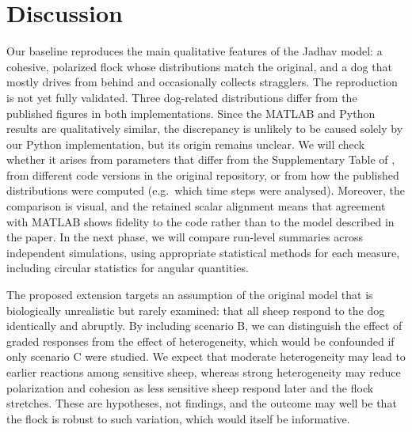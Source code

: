 \documentclass[9pt,twoside]{pnas-new}
\begin{document}


\section{Discussion}

Our baseline reproduces the main qualitative features of the Jadhav model: a cohesive, polarized flock whose distributions match the original, and a dog that mostly drives from behind and occasionally collects stragglers. The reproduction is not yet fully validated. Three dog-related distributions differ from the published figures in both implementations. Since the MATLAB and Python results are qualitatively similar, the discrepancy is unlikely to be caused solely by our Python implementation, but its origin remains unclear. We will check whether it arises from parameters that differ from the Supplementary Table of \cite{jadhav2024}, from different code versions in the original repository, or from how the published distributions were computed (e.g.\ which time steps were analysed). Moreover, the comparison is visual, and the retained scalar alignment means that agreement with MATLAB shows fidelity to the code rather than to the model described in the paper. In the next phase, we will compare run-level summaries across independent simulations, using appropriate statistical methods for each measure, including circular statistics for angular quantities.

The proposed extension targets an assumption of the original model that is biologically unrealistic but rarely examined: that all sheep respond to the dog identically and abruptly. By including scenario B, we can distinguish the effect of graded responses from the effect of heterogeneity, which would be confounded if only scenario C were studied. We expect that moderate heterogeneity may lead to earlier reactions among sensitive sheep, whereas strong heterogeneity may reduce polarization and cohesion as less sensitive sheep respond later and the flock stretches. These are hypotheses, not findings, and the outcome may well be that the flock is robust to such variation, which would itself be informative.
\end{document}
